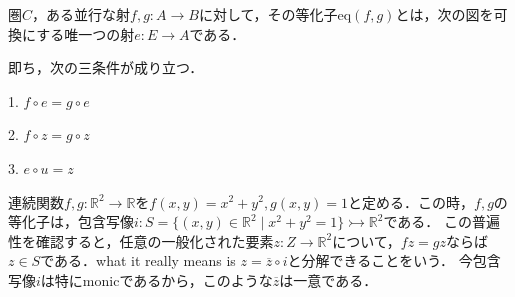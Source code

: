 \documentclass[uplatex, 12pt, dvipdfmx]{jsarticle}
\begin{document}
\begin{definition}
    圏$C$，ある並行な射$f,g:A\to B$に対して，その等化子$\mathrm{eq}(f,g)$とは，次の図を可換にする唯一つの射$e:E\to A$である．
    \begin{center}\end{center}
    即ち，次の三条件が成り立つ．

    1. $f\circ e=g\circ e$

    2. $f\circ z=g\circ z$

    3. $e\circ u=z$
\end{definition}

\begin{example}[Top]
    連続関数$f,g:\mathbb{R}^2\to\mathbb{R}$を$f(x,y)=x^2+y^2, g(x,y)=1$と定める．この時，$f,g$の等化子は，包含写像$i:S=\{(x,y)\in\mathbb{R}^2\mid x^2+y^2=1\}\rightarrowtail\mathbb{R}^2$である．
    この普遍性を確認すると，任意の一般化された要素$z:Z\to\mathbb{R}^2$について，$fz=gz$ならば$z\in S$である．what it really means is $z=\overline{z}\circ i$と分解できることをいう．
    今包含写像$i$は特にmonicであるから，このような$\overline{z}$は一意である．
    \begin{center}\end{center}
\end{example}
\end{document}
